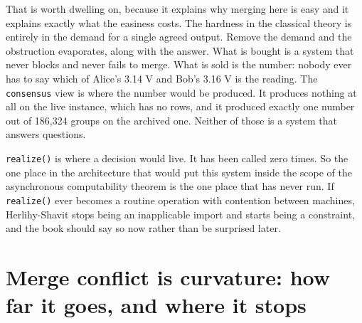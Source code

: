 That is worth dwelling on, because it explains why merging here is easy and it explains exactly what the easiness costs. The hardness in the classical theory is entirely in the demand for a single agreed output. Remove the demand and the obstruction evaporates, along with the answer. What is bought is a system that never blocks and never fails to merge. What is sold is the number: nobody ever has to say which of Alice's 3.14 V and Bob's 3.16 V is the reading. The \texttt{consensus} view is where the number would be produced. It produces nothing at all on the live instance, which has no rows, and it produced exactly one number out of 186,324 groups on the archived one. Neither of those is a system that answers questions.

\texttt{realize()} is where a decision would live. It has been called zero times. So the one place in the architecture that would put this system inside the scope of the asynchronous computability theorem is the one place that has never run. If \texttt{realize()} ever becomes a routine operation with contention between machines, Herlihy-Shavit stops being an inapplicable import and starts being a constraint, and the book should say so now rather than be surprised later.

\section{Merge conflict is curvature: how far it goes, and where it stops}

